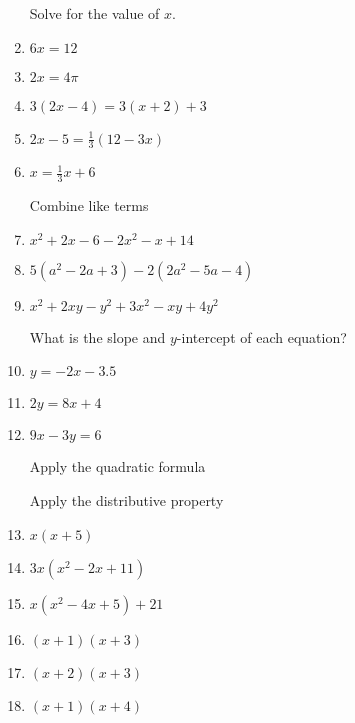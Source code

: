 \documentclass[12pt, oneside]{article}
\begin{document}
\begin{enumerate}
  \newpage
Solve for the value of $x$.
  \item   $6x=12$ \vspace{2cm}
  \item   $2x=4\pi$ \vspace{2cm}

  \item   $3(2x-4)=3(x+2)+3$ \vspace{4.5cm}
  \item   $2x-5=\frac{1}{3}(12-3x)$ \vspace{4.5cm}
  \item   $x=\frac{1}{3}x+6$ \vspace{3cm}

  \newpage
Combine like terms
  \item $x^2+2x -6 -2x^2-x+14$ \vspace{3cm}
  \item $5(a^2-2a +3) -2(2a^2-5a-4)$ \vspace{4cm}
  \item $x^2+2xy -y^2 +3x^2-xy+4y^2$ \vspace{3cm}

What is the slope and $y$-intercept of each equation?
  \item   $y=-2x-3.5$ \vspace{2cm}
  \item   $2y=8x+4$ \vspace{2cm}
  \item   $9x-3y=6$ \vspace{3cm}

\newpage
Apply the quadratic formula


\newpage
Apply the distributive property
  \item $x(x+5)$ \vspace{2cm}
  \item $3x(x^2-2x+11)$ \vspace{2.5cm}
  \item $x(x^2-4x+5)+21$  \vspace{2.5cm}
  \item $(x+1)(x+3)$ \vspace{3cm}
  \item $(x+2)(x+3)$ \vspace{3cm}
  \item $(x+1)(x+4)$ \vspace{3cm}


\end{enumerate}
\end{document}
